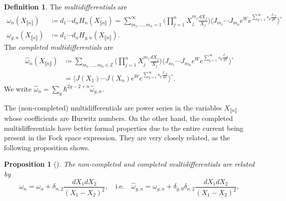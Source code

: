 \documentclass[10pt,a4paper,oneside,no-math,reqno]{amsart}%
\theoremstyle{plain}
\newtheorem{proposition}[theorem]{Proposition}
\theoremstyle{definition}
\newtheorem{definition}[theorem]{Definition}
\theoremstyle{remark}
\numberwithin{equation}{section}
\newcommand{\mb}[1]{\mathbb{#1}}
\newcommand{\1}{\mathds{1}}
\newcommand{\Z}{\mb{Z}}
\newcommand{\<}{\langle}
\renewcommand{\>}{\rangle}
\begin{document}
\begin{definition}\label{def:Multidifferentials}
    The \emph{multidifferentials} are
    \begin{align}
        \omega_{n} (X_{\llbracket n \rrbracket} )
        &\coloneqq
        d_1 \dotsb d_n H_{n} (X_{\llbracket n \rrbracket})
        =
        \sum_{m_1, \dotsc, m_n = 1}^\infty \Big( \prod_{j=1}^n X_j^{m_j} \frac{dX_j}{X_j} \Big) \Big\< J_{m_1} \dotsb J_{m_n} e^W e^{\sum_{q=1}^\infty s_q \frac{J_{-q}}{q\hbar}} \Big\>^\circ
        \\
        \omega_{g,n} (X_{\llbracket n \rrbracket} )
        &\coloneqq
        d_1 \dotsb d_n H_{g,n} (X_{\llbracket n \rrbracket}).
    \end{align}
    The \emph{completed multidifferentials} are
    \begin{equation}\label{Correlators}
        \begin{split}
            \widehat{\omega}_{n} (X_{\llbracket n \rrbracket} )
            &\coloneqq
            \sum_{m_1, \dotsc, m_n \in \Z} \Big( \prod_{j=1}^n X_j^{m_j} \frac{dX_j}{X_j} \Big) \Big\< J_{m_1} \dotsb J_{m_n} e^W e^{\sum_{q=1}^\infty s_q \frac{J_{-q}}{q\hbar}} \Big\>^\circ
            \\
            &=
            \Big\< J(X_1) \dotsb J(X_n) e^W e^{\sum_{q=1}^\infty s_q \frac{J_{-q}}{q\hbar}} \Big\>^\circ.
        \end{split}
    \end{equation}
    We write $\widehat{\omega}_n=\sum_g \hbar^{2g-2+n}\widehat{\omega}_{g,n}$.
\end{definition}

The (non-completed) multidifferentials are power series in the variables $ X_{\llbracket n \rrbracket}$ whose coefficients are Hurwitz numbers. On the other hand, the completed multidifferentials have better formal properties due to the entire current being present in the Fock space expression. They are very closely related, as the following proposition shows.

\begin{proposition}[{\cite[Proposition 4.1]{BDKS22}}]\label{CompletedNoncompleted}
    The non-completed and completed multidifferentials are related by
    \begin{equation}
        \widehat{\omega}_n
        =
        \omega_n + \delta_{n,2} \frac{dX_1 dX_2}{(X_1 - X_2)^2} ,
        \quad
        \text{i.e.}
        \quad
        \widehat{\omega}_{g,n}
        =
        \omega_{g,n} + \delta_{g,0} \delta_{n,2} \frac{dX_1 dX_2}{(X_1 - X_2)^2} ,
    \end{equation}
\end{proposition}
\end{document}
